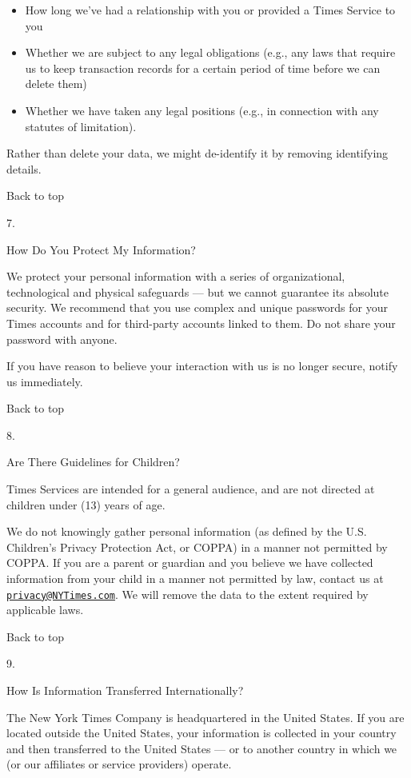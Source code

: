 \begin{itemize}
\tightlist
\item
  How long we've had a relationship with you or provided a Times Service
  to you
\item
  Whether we are subject to any legal obligations (e.g., any laws that
  require us to keep transaction records for a certain period of time
  before we can delete them)
\item
  Whether we have taken any legal positions (e.g., in connection with
  any statutes of limitation).
\end{itemize}

Rather than delete your data, we might de-identify it by removing
identifying details.

Back to top

7.

How Do You Protect My Information?

We protect your personal information with a series of organizational,
technological and physical safeguards --- but we cannot guarantee its
absolute security. We recommend that you use complex and unique
passwords for your Times accounts and for third-party accounts linked to
them. Do not share your password with anyone.

If you have reason to believe your interaction with us is no longer
secure, notify us immediately.

Back to top

8.

Are There Guidelines for Children?

Times Services are intended for a general audience, and are not directed
at children under (13) years of age.

We do not knowingly gather personal information (as defined by the U.S.
Children's Privacy Protection Act, or COPPA) in a manner not permitted
by COPPA. If you are a parent or guardian and you believe we have
collected information from your child in a manner not permitted by law,
contact us at
\href{mailto:privacy@NYTimes.com}{\nolinkurl{privacy@NYTimes.com}}. We
will remove the data to the extent required by applicable laws.

Back to top

9.

How Is Information Transferred Internationally?

The New York Times Company is headquartered in the United States. If you
are located outside the United States, your information is collected in
your country and then transferred to the United States --- or to another
country in which we (or our affiliates or service providers) operate.

